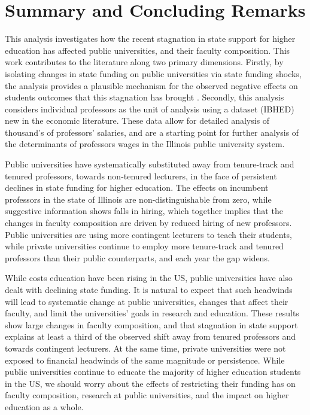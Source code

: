 \section{Summary and Concluding Remarks}
\label{sec:conclusion}

This analysis investigates how the recent stagnation in state support for higher education has affected public universities, and their faculty composition.
This work contributes to the literature along two primary dimensions.
Firstly, by isolating changes in state funding on public universities via state funding shocks, the analysis provides a plausible mechanism for the observed negative effects on students outcomes that this stagnation has brought \citep{NBERw23736,NBERw27885}.
Secondly, this analysis considers individual professors as the unit of analysis using a dataset (IBHED) new in the economic literature.
These data allow for detailed analysis of thousand's of professors' salaries, and are a starting point for further analysis of the determinants of professors wages in the Illinois public university system.

Public universities have systematically substituted away from tenure-track and tenured professors, towards non-tenured lecturers, in the face of persistent declines in state funding for higher education.
The effects on incumbent professors in the state of Illinois are non-distinguishable from zero, while suggestive information shows falls in hiring, which together implies that the changes in faculty composition are driven by reduced hiring of new professors.
Public universities are using more contingent lecturers to teach their students, while private universities continue to employ more tenure-track and tenured professors than their public counterparts, and each year the gap widens.

While costs education have been rising in the US, public universities have also dealt with declining state funding.
It is natural to expect that such headwinds will lead to systematic change at public universities, changes that affect their faculty, and limit the universities' goals in research and education.
These results show large changes in faculty composition, and that stagnation in state support explains at least a third of the observed shift away from tenured professors and towards contingent lecturers.
At the same time, private universities were not exposed to financial headwinds of the same magnitude or persistence.
While public universities continue to educate the majority of higher education students in the US, we should worry about the effects of restricting their funding has on faculty composition, research at public universities, and the impact on higher education as a whole.
